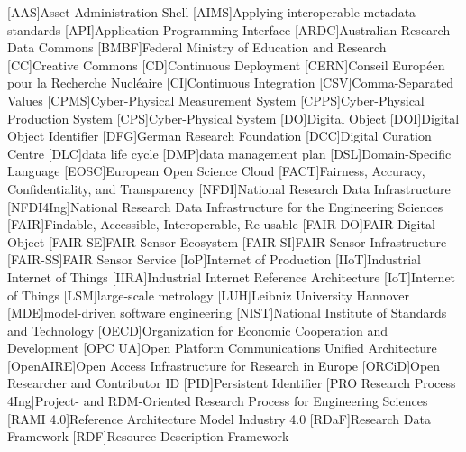 

\begin{acronym}[JSONP]\itemsep0pt
[AAS]{Asset Administration Shell}
[AIMS]{Applying interoperable metadata standards}
[API]{Application Programming Interface}
[ARDC]{Australian Research Data Commons}
[BMBF]{Federal Ministry of Education and Research}
[CC]{Creative Commons}
[CD]{Continuous Deployment}
[CERN]{Conseil Européen pour la Recherche Nucléaire}
[CI]{Continuous Integration}
[CSV]{Comma-Separated Values}
[CPMS]{Cyber-Physical Measurement System}
[CPPS]{Cyber-Physical Production System}
[CPS]{Cyber-Physical System}
[DO]{Digital Object}
[DOI]{Digital Object Identifier}
[DFG]{German Research Foundation}
[DCC]{Digital Curation Centre}
[DLC]{data life cycle}
[DMP]{data management plan}
[DSL]{Domain-Specific Language}
[EOSC]{European Open Science Cloud}
[FACT]{Fairness, Accuracy, Confidentiality, and Transparency}
[NFDI]{National Research Data Infrastructure}
[NFDI4Ing]{National Research Data Infrastructure for the Engineering Sciences}
[FAIR]{Findable, Accessible, Interoperable, Re-usable}
[FAIR-DO]{FAIR Digital Object}
[FAIR-SE]{FAIR Sensor Ecosystem}
[FAIR-SI]{FAIR Sensor Infrastructure}
[FAIR-SS]{FAIR Sensor Service}
[IoP]{Internet of Production}
[IIoT]{Industrial Internet of Things}
[IIRA]{Industrial Internet Reference Architecture}
[IoT]{Internet of Things}
[LSM]{large-scale metrology}
[LUH]{Leibniz University Hannover}
[MDE]{model-driven software engineering}
[NIST]{National Institute of Standards and Technology}
[OECD]{Organization for Economic Cooperation and Development}
[OPC UA]{Open Platform Communications Unified Architecture}
[OpenAIRE]{Open Access Infrastructure for Research in Europe}
[ORCiD]{Open Researcher and Contributor ID}
[PID]{Persistent Identifier}
[PRO\allowbreak{} Research\allowbreak{} Process\allowbreak{} 4Ing]{Project-\allowbreak{} and\allowbreak{} RDM-Oriented\allowbreak{} Research Process\allowbreak{} for\allowbreak{} Engineering Sciences}
[RAMI 4.0]{Reference Architecture Model Industry 4.0}
[RDaF]{Research Data Framework}
[RDF]{Resource Description Framework}

\end{acronym}

